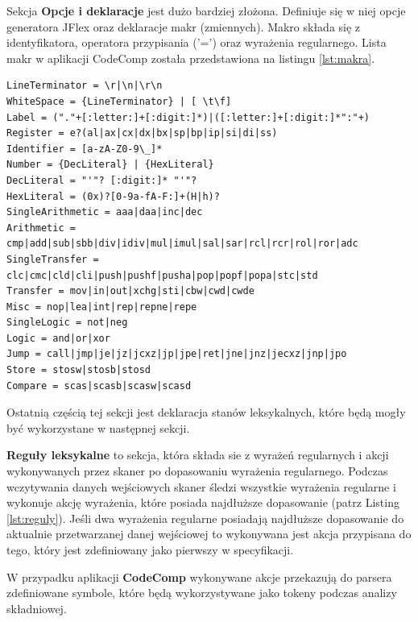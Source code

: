 \documentclass[a4paper,12pt]{article}
\begin{document}
Sekcja \textbf{Opcje i deklaracje} jest dużo bardziej złożona. Definiuje się w niej opcje generatora JFlex oraz deklaracje makr (zmiennych). Makro składa się z identyfikatora, operatora przypisania ('=') oraz wyrażenia regularnego. Lista makr w aplikacji CodeComp została przedstawiona na listingu \ref{lst:makra}.

\begin{lstlisting}[caption={Makra zdefiniowane w programie CodeComp.}, label={lst:makra}]
LineTerminator = \r|\n|\r\n
WhiteSpace = {LineTerminator} | [ \t\f]
Label = ("."+[:letter:]+[:digit:]*)|([:letter:]+[:digit:]*":"+)
Register = e?(al|ax|cx|dx|bx|sp|bp|ip|si|di|ss)
Identifier = [a-zA-Z0-9\_]*
Number = {DecLiteral} | {HexLiteral}
DecLiteral = "'"? [:digit:]* "'"?
HexLiteral = (0x)?[0-9a-fA-F:]+(H|h)?
SingleArithmetic = aaa|daa|inc|dec
Arithmetic = cmp|add|sub|sbb|div|idiv|mul|imul|sal|sar|rcl|rcr|rol|ror|adc
SingleTransfer = clc|cmc|cld|cli|push|pushf|pusha|pop|popf|popa|stc|std
Transfer = mov|in|out|xchg|sti|cbw|cwd|cwde
Misc = nop|lea|int|rep|repne|repe
SingleLogic = not|neg
Logic = and|or|xor
Jump = call|jmp|je|jz|jcxz|jp|jpe|ret|jne|jnz|jecxz|jnp|jpo
Store = stosw|stosb|stosd
Compare	= scas|scasb|scasw|scasd
\end{lstlisting}

Ostatnią częścią tej sekcji jest deklaracja stanów leksykalnych, które będą mogły być wykorzystane w następnej sekcji.

\textbf{Reguły leksykalne} to sekcja, która składa sie z wyrażeń regularnych i akcji wykonywanych przez skaner po dopasowaniu wyrażenia regularnego. Podczas wczytywania danych wejściowych skaner śledzi wszystkie wyrażenia regularne i wykonuje akcję wyrażenia, które posiada najdłuższe dopasowanie (patrz Listing \ref{lst:reguly}). Jeśli dwa wyrażenia regularne posiadają najdłuższe dopasowanie do aktualnie przetwarzanej danej wejściowej to wykonywana jest akcja przypisana do tego, który jest zdefiniowany jako pierwszy w specyfikacji.

W przypadku aplikacji \textbf{CodeComp} wykonywane akcje przekazują do parsera zdefiniowane symbole, które będą wykorzystywane jako tokeny podczas analizy składniowej.
\end{document}
